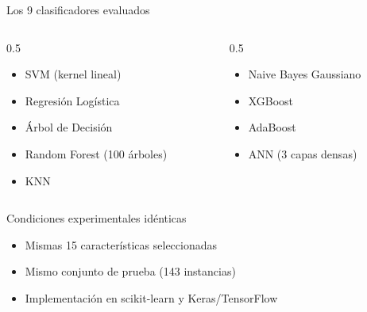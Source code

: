 \documentclass[10pt,aspectratio=169]{beamer}
\begin{document}
\begin{frame}{Los 9 clasificadores evaluados}
\begin{columns}
\begin{column}{0.5\textwidth}
\begin{itemize}
  \item SVM (kernel lineal)
  \item Regresión Logística
  \item Árbol de Decisión
  \item Random Forest (100 árboles)
  \item KNN
\end{itemize}
\end{column}

\begin{column}{0.5\textwidth}
\begin{itemize}
  \item Naive Bayes Gaussiano
  \item XGBoost
  \item AdaBoost
  \item ANN (3 capas densas)
\end{itemize}
\end{column}
\end{columns}

\vspace{1em}
\begin{block}{Condiciones experimentales idénticas}
\begin{itemize}
  \item Mismas 15 características seleccionadas
  \item Mismo conjunto de prueba (143 instancias)
  \item Implementación en scikit-learn y Keras/TensorFlow
\end{itemize}
\end{block}
\end{frame}
\end{document}
